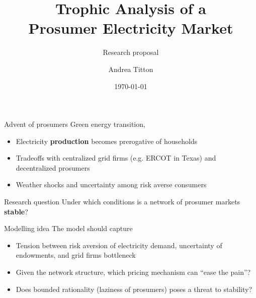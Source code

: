 \documentclass[xcolor={svgnames}]{beamer}
\title[Trophic analysis of Electricity markets]{Trophic Analysis of a\\ Prosumer Electricity Market}
\subtitle{Research proposal}
\author{Andrea Titton}
\institute{Tinbergen Institute}
\date{\today}
\begin{document}
\frame{\titlepage}

\begin{frame}{Advent of prosumers}
    Green energy transition,
    \begin{itemize}\setlength\itemsep{1em}
        \item Electricity \textbf{production} becomes prerogative of households
        \item Tradeoffs with centralized grid firms (e.g. ERCOT in Texas) and decentralized prosumers
        \item Weather shocks and uncertainty among risk averse consumers
    \end{itemize}
\end{frame}

\begin{frame}{Research question}
    Under which conditions is a network of prosumer markets \textbf{stable}?

\end{frame}

\begin{frame}{Modelling idea}
    The model should capture
    \begin{itemize}\setlength\itemsep{1em}
        \item Tension between risk aversion of electricity demand, uncertainty of endowments, and grid firms bottleneck
        \item Given the network structure, which pricing mechanism can ``ease the pain''?
        \item Does bounded rationality (laziness of prosumers) poses a threat to stability?
    \end{itemize}
\end{frame}
\end{document}
